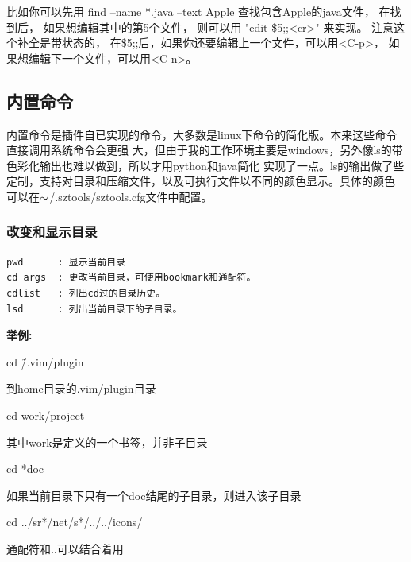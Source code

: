 \documentclass[oneside,openany]{book}
\begin{document}
  比如你可以先用 find --name *.java --text Apple 查找包含Apple的java文件， 在找到后，
如果想编辑其中的第5个文件， 则可以用 "edit \$5;;<cr>" 来实现。 注意这个补全是带状态的，
在\$5;;后，如果你还要编辑上一个文件，可以用<C-p>， 如果想编辑下一个文件，可以用<C-n>。


\subsection{内置命令}
     内置命令是插件自已实现的命令，大多数是linux下命令的简化版。本来这些命令直接调用系统命令会更强
大，但由于我的工作环境主要是windows，另外像ls的带色彩化输出也难以做到，所以才用python和java简化
实现了一点。ls的输出做了些定制，支持对目录和压缩文件，以及可执行文件以不同的颜色显示。具体的颜色
可以在$\tiny{\sim}$/.sztools/sztools.cfg文件中配置。

\subsubsection{改变和显示目录}

\begin{verbatim}
pwd      : 显示当前目录
cd args  : 更改当前目录，可使用bookmark和通配符。
cdlist   : 列出cd过的目录历史。
lsd      : 列出当前目录下的子目录。
\end{verbatim}

\begin{flushleft}\textbf{举例:}\end{flushleft}
\begin{mdframed}[style=SmallFrame] cd \~/.vim/plugin \end{mdframed}到home目录的.vim/plugin目录
\vspace{4mm}

\begin{mdframed}[style=SmallFrame] cd work/project \end{mdframed}其中work是定义的一个书签，并非子目录
\vspace{4mm}

\begin{mdframed}[style=SmallFrame] cd *doc \end{mdframed}如果当前目录下只有一个doc结尾的子目录，则进入该子目录
\vspace{4mm}

\begin{mdframed}[style=SmallFrame] cd ../sr*/net/s*/../../icons/ \end{mdframed}通配符和..可以结合着用
\vspace{4mm}
\end{document}
